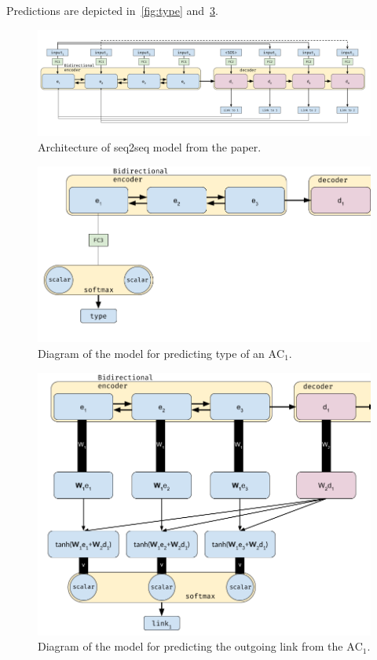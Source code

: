 \documentclass[onecolumn]{article}
\begin{document}
Predictions are depicted in~\autoref{fig:type} and~\ref{fig:link}.

\begin{figure}[h]
    \centering
    \includegraphics[width=0.95\linewidth]{fig/seq2seq.png}
    \caption{Architecture of seq2seq model from the paper.}\label{fig:seq2seq}
\end{figure}

\begin{figure}[h]
    \centering
    \includegraphics[width=0.8\linewidth]{fig/type.png}
    \caption{Diagram of the model for predicting type of an $\text{AC}_1$.}\label{fig:type}
\end{figure}

\begin{figure}[h]
    \centering
    \includegraphics[width=0.8\linewidth]{fig/link.png}
    \caption{Diagram of the model for predicting the outgoing link from the $\text{AC}_1$.}\label{fig:link}
\end{figure}
\end{document}
